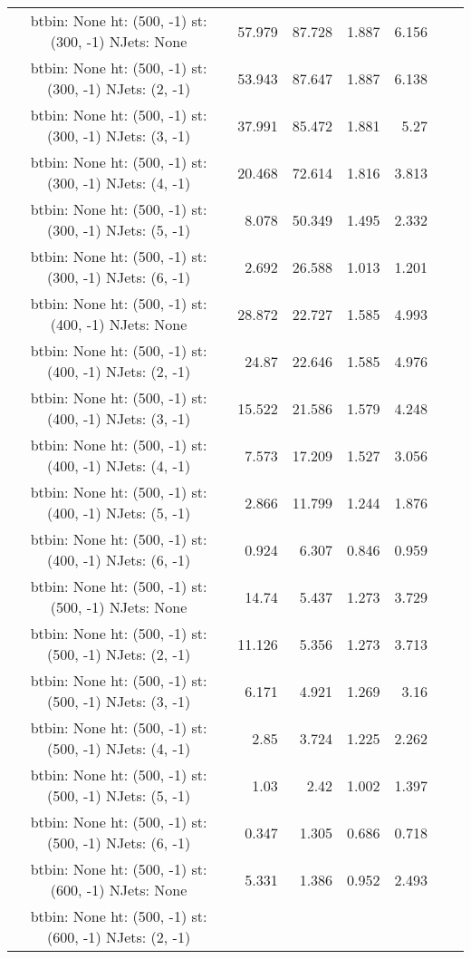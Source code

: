 \documentclass[12pt]{paper}
\begin{document}
\begin{landscape}
\begin{longtable}{c|r|r|r|r|r|r}
btbin:  None ht:  (500, -1) st:  (300, -1) NJets:  None
 & 57.979 & 87.728 & 1.887 & 6.156\\
btbin:  None ht:  (500, -1) st:  (300, -1) NJets:  (2, -1)
 & 53.943 & 87.647 & 1.887 & 6.138\\
btbin:  None ht:  (500, -1) st:  (300, -1) NJets:  (3, -1)
 & 37.991 & 85.472 & 1.881 & 5.27\\
btbin:  None ht:  (500, -1) st:  (300, -1) NJets:  (4, -1)
 & 20.468 & 72.614 & 1.816 & 3.813\\
btbin:  None ht:  (500, -1) st:  (300, -1) NJets:  (5, -1)
 & 8.078 & 50.349 & 1.495 & 2.332\\
btbin:  None ht:  (500, -1) st:  (300, -1) NJets:  (6, -1)
 & 2.692 & 26.588 & 1.013 & 1.201\\
btbin:  None ht:  (500, -1) st:  (400, -1) NJets:  None
 & 28.872 & 22.727 & 1.585 & 4.993\\
btbin:  None ht:  (500, -1) st:  (400, -1) NJets:  (2, -1)
 & 24.87 & 22.646 & 1.585 & 4.976\\
btbin:  None ht:  (500, -1) st:  (400, -1) NJets:  (3, -1)
 & 15.522 & 21.586 & 1.579 & 4.248\\
btbin:  None ht:  (500, -1) st:  (400, -1) NJets:  (4, -1)
 & 7.573 & 17.209 & 1.527 & 3.056\\
btbin:  None ht:  (500, -1) st:  (400, -1) NJets:  (5, -1)
 & 2.866 & 11.799 & 1.244 & 1.876\\
btbin:  None ht:  (500, -1) st:  (400, -1) NJets:  (6, -1)
 & 0.924 & 6.307 & 0.846 & 0.959\\
btbin:  None ht:  (500, -1) st:  (500, -1) NJets:  None
 & 14.74 & 5.437 & 1.273 & 3.729\\
btbin:  None ht:  (500, -1) st:  (500, -1) NJets:  (2, -1)
 & 11.126 & 5.356 & 1.273 & 3.713\\
btbin:  None ht:  (500, -1) st:  (500, -1) NJets:  (3, -1)
 & 6.171 & 4.921 & 1.269 & 3.16\\
btbin:  None ht:  (500, -1) st:  (500, -1) NJets:  (4, -1)
 & 2.85 & 3.724 & 1.225 & 2.262\\
btbin:  None ht:  (500, -1) st:  (500, -1) NJets:  (5, -1)
 & 1.03 & 2.42 & 1.002 & 1.397\\
btbin:  None ht:  (500, -1) st:  (500, -1) NJets:  (6, -1)
 & 0.347 & 1.305 & 0.686 & 0.718\\
btbin:  None ht:  (500, -1) st:  (600, -1) NJets:  None
 & 5.331 & 1.386 & 0.952 & 2.493\\
btbin:  None ht:  (500, -1) st:  (600, -1) NJets:  (2, -1)

\end{longtable}
\end{landscape}
\end{document}
